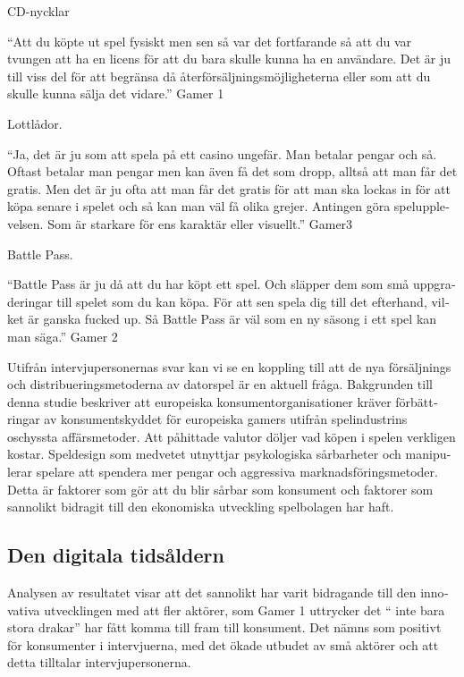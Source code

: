 \documentclass[11p]{article}
\begin{document}
\begin{otherlanguage}{swedish}
    CD-nycklar

    \setlength{\leftskip}{1cm}
    “Att du köpte ut spel fysiskt men sen så var det fortfarande så att du var tvungen att ha en licens för att du bara skulle kunna ha en användare. Det är ju till viss del för att begränsa då återförsäljningsmöjligheterna eller som att du skulle kunna sälja det vidare.” Gamer 1

    \setlength{\leftskip}{0cm}
    Lottlådor.

    \setlength{\leftskip}{1cm}
    “Ja, det är ju som att spela på ett casino ungefär. Man betalar pengar och så. Oftast betalar man pengar men kan även få det som dropp, alltså att man får det gratis. Men det är ju ofta att man får det gratis för att man ska lockas in för att köpa senare i spelet och så kan man väl få olika grejer. Antingen göra spelupplevelsen. Som är starkare för ens karaktär eller visuellt.” Gamer3

    \setlength{\leftskip}{0cm}
    Battle Pass.

    \setlength{\leftskip}{1cm}
    “Battle Pass är ju då att du har köpt ett spel. Och släpper dem som små uppgraderingar till spelet som du kan köpa. För att sen spela dig till det efterhand, vilket är ganska fucked up. Så Battle Pass är väl som en ny säsong i ett spel kan man säga.” Gamer 2


    \setlength{\leftskip}{0cm}

    Utifrån intervjupersonernas svar kan vi se en koppling till att de nya försäljnings och distribueringsmetoderna av datorspel är en aktuell fråga.  Bakgrunden till denna studie beskriver att europeiska konsumentorganisationer kräver förbättringar av konsumentskyddet för europeiska gamers utifrån spelindustrins oschyssta affärsmetoder. Att påhittade valutor döljer vad köpen i spelen verkligen kostar. Speldesign som medvetet utnyttjar psykologiska sårbarheter och manipulerar spelare att spendera mer pengar och aggressiva marknadsföringsmetoder. Detta är faktorer som gör att du blir sårbar som konsument och faktorer som sannolikt bidragit till den ekonomiska utveckling spelbolagen har haft.

    \subsection{Den digitala tidsåldern}
    Analysen av resultatet visar att det sannolikt har varit bidragande till den innovativa utvecklingen med att fler aktörer, som Gamer 1 uttrycker det “ inte bara stora drakar” har fått komma till fram till konsument. Det nämns som positivt för konsumenter i intervjuerna, med det ökade utbudet av små aktörer och att detta tilltalar intervjupersonerna.


\end{otherlanguage}
\end{document}
